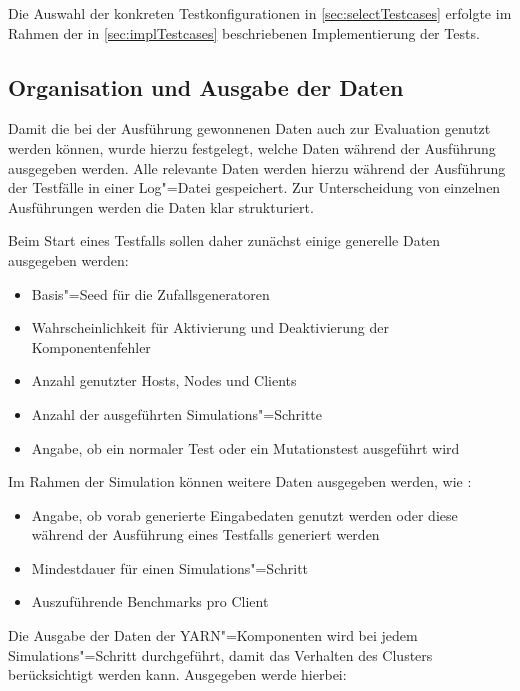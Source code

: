 Die Auswahl der konkreten Testkonfigurationen in \autoref{sec:selectTestcases} erfolgte im Rahmen der in \autoref{sec:implTestcases} beschriebenen Implementierung der Tests.

\subsection{Organisation und Ausgabe der Daten}
\label{sec:dataOrganisation}

Damit die bei der Ausführung gewonnenen Daten auch zur Evaluation genutzt werden können, wurde hierzu festgelegt, welche Daten während der Ausführung ausgegeben werden.
Alle relevante Daten werden hierzu während der Ausführung der Testfälle in einer Log"=Datei gespeichert.
Zur Unterscheidung von einzelnen Ausführungen werden die Daten klar strukturiert.

Beim Start eines Testfalls sollen daher zunächst einige generelle Daten ausgegeben werden:

\begin{itemize}
    \item Basis"=Seed für die Zufallsgeneratoren
    \item Wahrscheinlichkeit für Aktivierung und Deaktivierung der Komponentenfehler
    \item Anzahl genutzter Hosts, Nodes und Clients
    \item Anzahl der ausgeführten Simulations"=Schritte
    \item Angabe, ob ein normaler Test oder ein Mutationstest ausgeführt wird
\end{itemize}

Im Rahmen der Simulation können weitere Daten ausgegeben werden, wie \zB:

\begin{itemize}
    \item Angabe, ob vorab generierte Eingabedaten genutzt werden oder diese während der Ausführung eines Testfalls generiert werden
    \item Mindestdauer für einen Simulations"=Schritt
    \item Auszuführende Benchmarks pro Client
\end{itemize}

Die Ausgabe der Daten der YARN"=Komponenten wird bei jedem Simulations"=Schritt durchgeführt, damit das Verhalten des Clusters berücksichtigt werden kann.
Ausgegeben werde hierbei:

